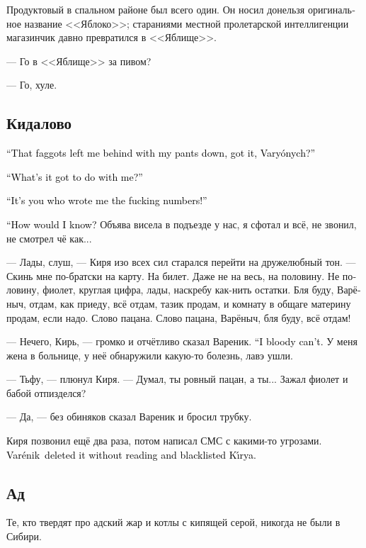 \documentclass[a5paper,12pt,fleqn]{extbook}\usepackage{cooltooltips}\usepackage{polyglossia}\setdefaultlanguage[babelshorthands=true]{russian}\setotherlanguage{english}\defaultfontfeatures{Ligatures=TeX,Mapping=tex-text} \usepackage{xcolor}\definecolor{lightgray}{HTML}{bbbbbb}\color{lightgray}\newcommand{\ml}[3]{\textenglish{\textcolor{black}{#3}}}
\newcommand{\Varenik}{Var\'enik}
\begin{document}
Продуктовый в спальном районе был всего один.
Он носил донельзя оригинальное название <<Яблоко>>;
стараниями местной пролетарской интеллигенции магазинчик давно превратился в <<Яблище>>.

--- Го в <<Яблище>> за пивом?

--- Го, хуле.


\subsection{Кидалово}

\ml{$0$}
{--- Эти пидоры меня вообще без штанов оставили, ты понял, Варёныч?}
{``That faggots left me behind with my pants down, got it, Vary\'onych?''}

\ml{$0$}
{--- Ну я-то тут при чём?}
{``What's it got to do with me?''}

\ml{$0$}
{--- Так ты, блядь, мне их цифры скинул!}
{``It's you who wrote me the fucking numbers!''}

\ml{$0$}
{--- Откуда я знал-то?}
{``How would I know?}
Объява висела в подъезде у нас, я сфотал и всё, не звонил, не смотрел чё как...

--- Лады, слуш, --- Киря изо всех сил старался перейти на дружелюбный тон.
--- Скинь мне по-братски на карту.
На билет.
Даже не на весь, на половину.
Не половину, фиолет, круглая цифра, лады, наскребу как-нить остатки.
Бля буду, Варёныч, отдам, как приеду, всё отдам, тазик продам, и комнату в общаге материну продам, если надо.
Слово пацана.
Слово пацана, Варёныч, бля буду, всё отдам!

--- Нечего, Кирь, --- громко и отчётливо сказал Вареник.
\ml{$0$}
{--- Реально, блядь, нечего.}
{``I bloody can't.}
У меня жена в больнице, у неё обнаружили какую-то болезнь, лавэ ушли.

--- Тьфу, --- плюнул Киря.
--- Думал, ты ровный пацан, а ты...
Зажал фиолет и бабой отпизделся?

--- Да, --- без обиняков сказал Вареник и бросил трубку.

Киря позвонил ещё два раза, потом написал СМС с какими-то угрозами.
\ml{$0$}
{Вареник удалил его не читая и бросил Кирю в чёрный список.}
{\Varenik\ deleted it without reading and blacklisted K\'{\i}rya.}

\subsection{Ад}

Те, кто твердят про адский жар и котлы с кипящей серой, никогда не были в Сибири.
\end{document}
